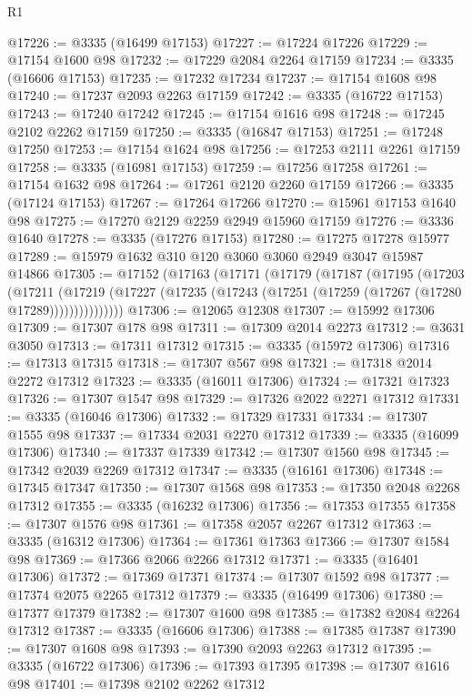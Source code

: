 \begin{lexlean}{R1}
\begin{coremodule}
@17226 := @3335 (@16499 @17153)
@17227 := @17224 @17226
@17229 := @17154 @1600 @98
@17232 := @17229 @2084 @2264 @17159
@17234 := @3335 (@16606 @17153)
@17235 := @17232 @17234
@17237 := @17154 @1608 @98
@17240 := @17237 @2093 @2263 @17159
@17242 := @3335 (@16722 @17153)
@17243 := @17240 @17242
@17245 := @17154 @1616 @98
@17248 := @17245 @2102 @2262 @17159
@17250 := @3335 (@16847 @17153)
@17251 := @17248 @17250
@17253 := @17154 @1624 @98
@17256 := @17253 @2111 @2261 @17159
@17258 := @3335 (@16981 @17153)
@17259 := @17256 @17258
@17261 := @17154 @1632 @98
@17264 := @17261 @2120 @2260 @17159
@17266 := @3335 (@17124 @17153)
@17267 := @17264 @17266
@17270 := @15961 @17153 @1640 @98
@17275 := @17270 @2129 @2259 @2949 @15960 @17159
@17276 := @3336 @1640
@17278 := @3335 (@17276 @17153)
@17280 := @17275 @17278 @15977
@17289 := @15979 @1632 @310 @120 @3060 @3060 @2949 @3047 @15987 @14866
@17305 := @17152
    (@17163
      (@17171
        (@17179
          (@17187
            (@17195
              (@17203
                (@17211
                  (@17219
                    (@17227 (@17235 (@17243 (@17251 (@17259 (@17267 (@17280 @17289)))))))))))))))
@17306 := @12065 @12308
@17307 := @15992 @17306
@17309 := @17307 @178 @98
@17311 := @17309 @2014 @2273
@17312 := @3631 @3050
@17313 := @17311 @17312
@17315 := @3335 (@15972 @17306)
@17316 := @17313 @17315
@17318 := @17307 @567 @98
@17321 := @17318 @2014 @2272 @17312
@17323 := @3335 (@16011 @17306)
@17324 := @17321 @17323
@17326 := @17307 @1547 @98
@17329 := @17326 @2022 @2271 @17312
@17331 := @3335 (@16046 @17306)
@17332 := @17329 @17331
@17334 := @17307 @1555 @98
@17337 := @17334 @2031 @2270 @17312
@17339 := @3335 (@16099 @17306)
@17340 := @17337 @17339
@17342 := @17307 @1560 @98
@17345 := @17342 @2039 @2269 @17312
@17347 := @3335 (@16161 @17306)
@17348 := @17345 @17347
@17350 := @17307 @1568 @98
@17353 := @17350 @2048 @2268 @17312
@17355 := @3335 (@16232 @17306)
@17356 := @17353 @17355
@17358 := @17307 @1576 @98
@17361 := @17358 @2057 @2267 @17312
@17363 := @3335 (@16312 @17306)
@17364 := @17361 @17363
@17366 := @17307 @1584 @98
@17369 := @17366 @2066 @2266 @17312
@17371 := @3335 (@16401 @17306)
@17372 := @17369 @17371
@17374 := @17307 @1592 @98
@17377 := @17374 @2075 @2265 @17312
@17379 := @3335 (@16499 @17306)
@17380 := @17377 @17379
@17382 := @17307 @1600 @98
@17385 := @17382 @2084 @2264 @17312
@17387 := @3335 (@16606 @17306)
@17388 := @17385 @17387
@17390 := @17307 @1608 @98
@17393 := @17390 @2093 @2263 @17312
@17395 := @3335 (@16722 @17306)
@17396 := @17393 @17395
@17398 := @17307 @1616 @98
@17401 := @17398 @2102 @2262 @17312

\end{coremodule}
\end{lexlean}
